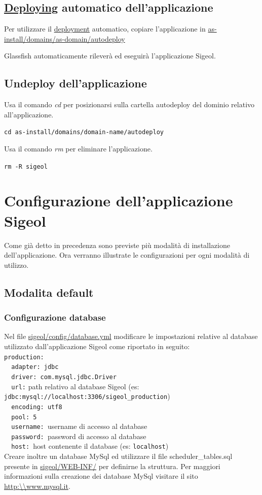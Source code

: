 \documentclass[11pt,a4paper]{article}
\begin{document}
\subsection{\underline{Deploying} automatico dell'applicazione}
Per utilizzare il \underline{deployment} automatico, copiare l'applicazione in \url{as-install/domains/as-domain/autodeploy} 

Glassfish automaticamente rileverà ed eseguirà l'applicazione Sigeol.
\subsection{Undeploy dell'applicazione}

Usa il comando \textit{cd} per posizionarsi sulla cartella autodeploy del dominio relativo all'applicazione.

\verb|cd as-install/domains/domain-name/autodeploy|

Usa il comando \textit{rm} per eliminare l'applicazione.

\verb|rm -R sigeol|
\section{Configurazione dell'applicazione Sigeol}
Come già detto in precedenza sono previste più modalità di installazione dell'applicazione.
Ora verranno illustrate le configurazioni per ogni modalità di utilizzo.
\subsection{Modalita default}
\subsubsection{Configurazione database}
Nel file \url{sigeol/config/database.yml} modificare le impostazioni relative al database utilizzato dall'applicazione Sigeol come riportato in seguito:\\
\verb|production:| \\
\verb|  adapter: jdbc |\\
\verb|  driver: com.mysql.jdbc.Driver |\\
\verb|  url:| path relativo al database Sigeol (es: \verb|jdbc:mysql://localhost:3306/sigeol_production|)\\
\verb|  encoding: utf8 |\\
\verb|  pool: 5 |\\
\verb|  username: |username di accesso al database\\
\verb|  password: |password di accesso al database\\
\verb|  host: |host contenente il database (es: \verb|localhost|)
\\
Creare inoltre un database MySql ed utilizzare il file scheduler\_tables.sql presente in \url{sigeol/WEB-INF/} per definirne la struttura. 
Per maggiori informazioni sulla creazione dei database MySql visitare il sito \url{http:\\www.mysql.it}.   
\end{document}
